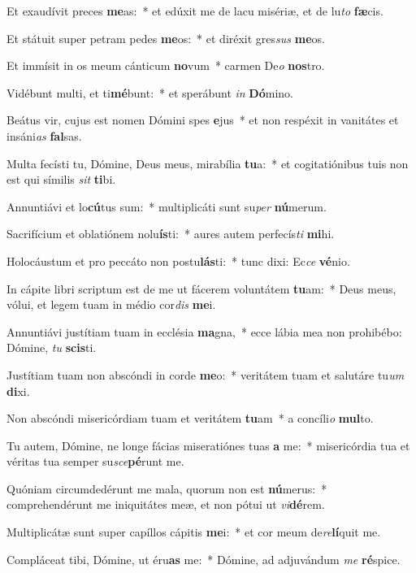 \item Et exaudívit preces \textbf{me}as:~* et edúxit me de lacu misériæ, et de lu\textit{to} \textbf{fæ}cis.
\item Et státuit super petram pedes \textbf{me}os:~* et diréxit gres\textit{sus} \textbf{me}os.
\item Et immísit in os meum cánticum \textbf{no}vum~* carmen De\textit{o} \textbf{nos}tro.
\item Vidébunt multi, et ti\textbf{mé}bunt:~* et sperábunt \textit{in} \textbf{Dó}mino.
\item Beátus vir, cujus est nomen Dómini spes \textbf{e}jus~* et non respéxit in vanitátes et insáni\textit{as} \textbf{fal}sas.
\item Multa fecísti tu, Dómine, Deus meus, mirabília \textbf{tu}a:~* et cogitatiónibus tuis non est qui símilis \textit{sit} \textbf{ti}bi.
\item Annuntiávi et lo\textbf{cú}tus sum:~* multiplicáti sunt su\textit{per} \textbf{nú}merum.
\item Sacrifícium et oblatiónem nolu\textbf{ís}ti:~* aures autem perfecís\textit{ti} \textbf{mi}hi.
\item Holocáustum et pro peccáto non postu\textbf{lás}ti:~* tunc dixi: Ec\textit{ce} \textbf{vé}nio.
\item In cápite libri scriptum est de me ut fácerem voluntátem \textbf{tu}am:~* Deus meus, vólui, et legem tuam in médio cor\textit{dis} \textbf{me}i.
\item Annuntiávi justítiam tuam in ecclésia \textbf{ma}gna,~* ecce lábia mea non prohibébo: Dómine, \textit{tu} \textbf{scis}ti.
\item Justítiam tuam non abscóndi in corde \textbf{me}o:~* veritátem tuam et salutáre tu\textit{um} \textbf{di}xi.
\item Non abscóndi misericórdiam tuam et veritátem \textbf{tu}am~* a concíli\textit{o} \textbf{mul}to.
\item Tu autem, Dómine, ne longe fácias miseratiónes tuas \textbf{a} me:~* misericórdia tua et véritas tua semper su\textit{sce}\textbf{pé}runt me.
\item Quóniam circumdedérunt me mala, quorum non est \textbf{nú}merus:~* comprehendérunt me iniquitátes meæ, et non pótui ut \textit{vi}\textbf{dé}rem.
\item Multiplicátæ sunt super capíllos cápitis \textbf{me}i:~* et cor meum de\textit{re}\textbf{lí}quit me.
\item Compláceat tibi, Dómine, ut éru\textbf{as} me:~* Dómine, ad adjuvándum \textit{me} \textbf{ré}spice.
